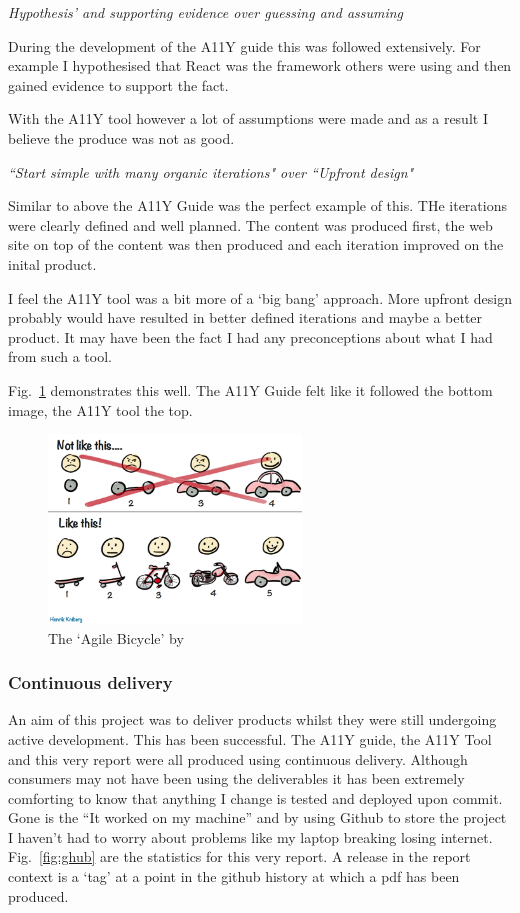 \begin{center}
\textit{Hypothesis’ and supporting evidence over guessing and assuming}
\end{center}
During the development of the A11Y guide this was followed extensively. For
example I hypothesised that React was the framework others were using and
then gained evidence to support the fact.

With the A11Y tool however a lot of assumptions were made and as a result I
believe the produce was not as good.

\begin{center}
\textit{``Start simple with many organic iterations" over ``Upfront design"}
\end{center}
Similar to above the A11Y Guide was the perfect example of this. THe
iterations were clearly defined and well planned. The content was produced
first, the web site on top of the content was then produced and each
iteration improved on the inital product.

I feel the A11Y tool was a bit more of a `big bang' approach. More upfront
design probably would have resulted in better defined iterations and maybe a
better product. It may have been the fact I had any preconceptions about what
I had from such a tool.

Fig.~\ref{fig:agile_bicycle} demonstrates this well. The A11Y Guide felt like
it followed the bottom image, the A11Y tool the top.

\begin{figure}[H]
\centering
\includegraphics[width=0.6\textwidth]{figures/agile_bicycle}
\captionsetup{justification=centering}
\caption{The `Agile Bicycle' by \citep{bicycle}
\label{fig:agile_bicycle}}
\end{figure}

\subsubsection{Continuous delivery}
An aim of this project was to deliver products whilst they were still
undergoing active development. This has been successful. The A11Y guide, the
A11Y Tool and this very report were all produced using continuous delivery.
Although consumers may not have been using the deliverables it has been
extremely comforting to know that anything I change is tested and deployed
upon commit. Gone is the ``It worked on my machine'' and by using Github to
store the project I haven't had to worry about problems like my laptop
breaking losing internet. Fig.~\ref{fig:ghub} are the statistics for this
very report. A release in the report context is a `tag' at a point in the
github history at which a pdf has been produced.

